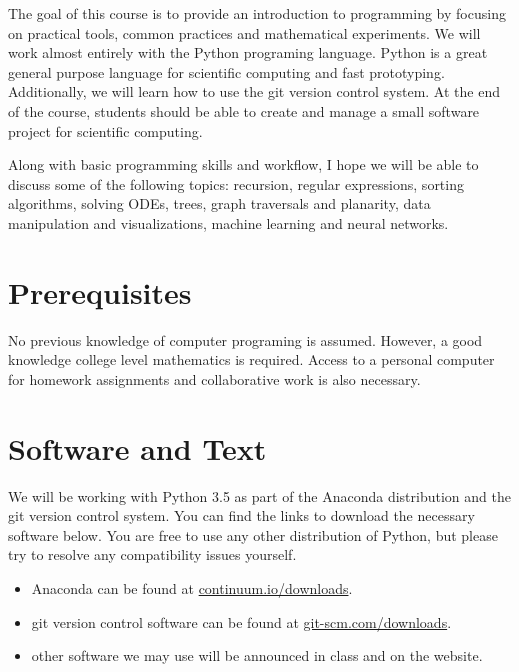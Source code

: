 \documentclass[a4paper,10pt]{article} %
\begin{document}
The goal of this course is to provide an introduction to programming by focusing on practical tools, common practices and mathematical experiments. We will work almost entirely with the Python programing language. Python is a great general purpose language for scientific computing and fast prototyping. Additionally, we will learn how to use the git version control system. At the end of the course, students should be able to create and manage a small software project for scientific computing.

Along with basic programming skills and workflow, I hope we will be able to discuss some of the following topics: recursion, regular expressions, sorting algorithms, solving ODEs, trees, graph traversals and planarity, data manipulation and visualizations, machine learning and neural networks.

\section{Prerequisites}

No previous knowledge of computer programing is assumed. However, a good knowledge college level mathematics is required. Access to a personal computer for homework assignments and collaborative work is also necessary.

\section{Software and Text} 

We will be working with Python 3.5 as part of the Anaconda distribution and the git version control system. You can find the links to download the necessary software below. You are free to use any other distribution of Python, but please try to resolve any compatibility issues yourself.

\begin{itemize}
\item Anaconda can be found at \href{https://www.continuum.io/downloads}{continuum.io/downloads}.
\vspace*{-0.5ex}
\item git version control software can be found at \href{https://git-scm.com/downloads}{git-scm.com/downloads}.
\vspace*{-0.5ex}
\item other software we may use will be announced in class and on the website.
\vspace*{-0.5ex}
\end{itemize}
\end{document}
